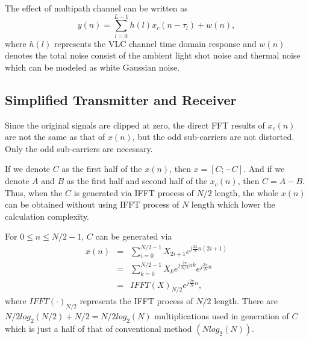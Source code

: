 \documentclass[journal]{IEEEtran}
\begin{document}
		The effect of multipath channel can be written as
        \begin{equation}\label{equ:multipath_effect}
          y(n)=\sum_{l=0}^{L-1}h(l)x_c(n-\tau_l)+w(n),
        \end{equation}
        where $h(l)$ represents the VLC channel time domain response and $w(n)$ denotes the total noise consist of the ambient light shot noise and thermal noise which can be modeled as white Gaussian noise\cite{Narmanlioglu2015}.

		
	\subsection{Simplified Transmitter and Receiver}
		Since the original signals are clipped at zero, the direct FFT results of $ x_c(n) $ are not the same as that of $ x(n) $, but the odd sub-carriers are not distorted. Only the odd sub-carriers are necessary.
		
		If we denote $ C $ as the first half of the $ x(n) $, then $ x=[C;-C] $. And if we denote $ A $ and $ B $ as the first half and second half of the $ x_c(n) $, then $ C = A - B $. Thus, when the $ C $ is generated via IFFT process of $ N/2 $ length, the whole $ x(n) $ can be obtained without using IFFT process of $ N $ length which lower the calculation complexity.
		
		For $ 0\leq n \leq N/2-1 $, $ C $ can be generated via		
		\begin{eqnarray}\label{equ:sim_transmitter}
			x(n) &=& \sum_{i=0}^{N/2-1} X_{2i+1}e^{j\frac{2\pi}{N}n(2i+1)} \nonumber\\
				 &=& \sum_{k=0}^{N/2-1} X_{k} e^{j\frac{2\pi}{N/2}nk}e^{j\frac{2\pi}{N}n} \nonumber\\
				 &=& IFFT(X)_{N/2}e^{j\frac{2\pi}{N}n},
		\end{eqnarray}
		where $ IFFT(\cdot)_{N/2} $	represents the IFFT process of $ N/2 $ length.	There are $ N/2 log_2(N/2) + N/2 = N/2 log_2(N) $ multiplications used in generation of $ C $ which is just a half of that of conventional method $( N log_2(N) )$.
		
\end{document}
